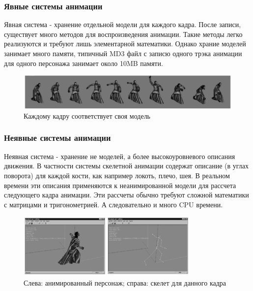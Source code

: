 \documentclass{beamer}
\begin{document}
\begin{frame}
\frametitle{Явные системы анимации}
\begin{scriptsize}
    Явная система - хранение отдельной модели для каждого кадра. После записи, существует много методов для воспроизведения анимации. Такие методы легко реализуются и требуют лишь элементарной математики. Однако храние моделей занимает много памяти, типичный MD3 файл с записю одного трэка анимации для одного персонажа занимает около 10MB памяти.
   
\begin{figure}[h!]
    \centering
    \includegraphics[width=1\textwidth]{explicit_animation.png}
    \caption{Каждому кадру соответствует своя модель}
\end{figure}

\end{scriptsize}
\end{frame}

  
\begin{frame}
\frametitle{Неявные системы анимации}
\begin{scriptsize}
    Неявная система - хранение не моделей, а более высокоуровневого описания движения. В частности системы скелетной анимации содержат описание (в углах поворота) для каждой кости, как например локоть, плечо, шея. В реальном времени эти описания применяются к неанимированной модели для рассчета следующего кадра анимации. Эти рассчеты обычно требуют сложной математики с матрицами и тригонометрией. А следовательно и много CPU времени.
    
\begin{figure}[h!]
    \centering
    \includegraphics[width=0.8\textwidth]{implicit_animation.png}
    \caption{\scriptsize{Слева: анимированный персонаж; справа: скелет для данного кадра}}
\end{figure}

\end{scriptsize}
\end{frame}
\end{document}
